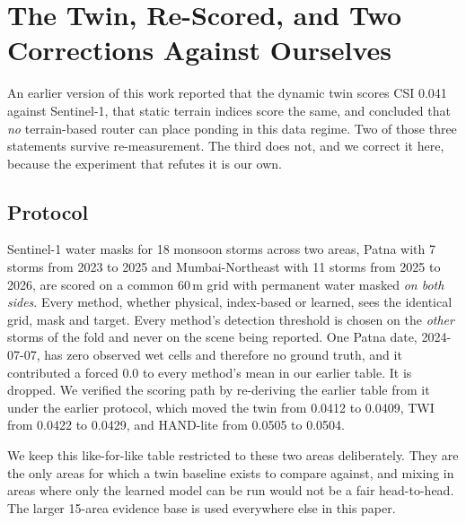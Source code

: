 \section{The Twin, Re-Scored, and Two Corrections Against Ourselves}
\label{sec:twin}

An earlier version of this work reported that the dynamic twin scores CSI 0.041 against Sentinel-1,
that static terrain indices score the same, and concluded that \emph{no} terrain-based router can
place ponding in this data regime. Two of those three statements survive re-measurement. The third
does not, and we correct it here, because the experiment that refutes it is our own.

\subsection{Protocol}
Sentinel-1 water masks for 18 monsoon storms across two areas, Patna with 7 storms from 2023 to
2025 and Mumbai-Northeast with 11 storms from 2025 to 2026, are scored on a common 60\,m grid with
permanent water masked \emph{on both sides}. Every method, whether physical, index-based or
learned, sees the identical grid, mask and target. Every method's detection threshold is chosen on
the \emph{other} storms of the fold and never on the scene being reported. One Patna date,
2024-07-07, has zero observed wet cells and therefore no ground truth, and it contributed a forced
0.0 to every method's mean in our earlier table. It is dropped. We verified the scoring path by
re-deriving the earlier table from it under the earlier protocol, which moved the twin from 0.0412
to 0.0409, TWI from 0.0422 to 0.0429, and HAND-lite from 0.0505 to 0.0504.

We keep this like-for-like table restricted to these two areas deliberately. They are the only
areas for which a twin baseline exists to compare against, and mixing in areas where only the
learned model can be run would not be a fair head-to-head. The larger 15-area evidence base is used
everywhere else in this paper.

